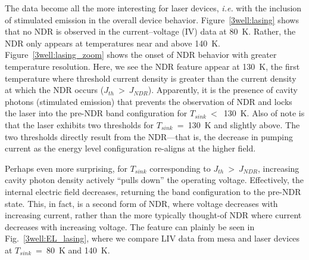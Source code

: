 \medskip

The data become all the more interesting for laser devices, \emph{i.e.} with the inclusion of stimulated emission in the overall device behavior. Figure~\ref{3well:lasing} shows that no NDR is observed in the current--voltage (IV) data at 80~K.  Rather, the NDR only appears at temperatures near and above 140~K.  Figure~\ref{3well:lasing_zoom} shows the onset of NDR behavior with greater temperature resolution.  Here, we see the NDR feature appear at 130~K, the first temperature where threshold current density is greater than the current density at which the NDR occurs ($J_{th}~>~J_{NDR}$).  Apparently, it is the presence of cavity photons (stimulated emission) that prevents the observation of NDR and locks the laser into the pre-NDR band configuration for $T_{sink}~<$~130~K.  Also of note is that the laser exhibits two thresholds for $T_{sink}$~=~130~K and slightly above.  The two thresholds directly result from the NDR---that is, the decrease in pumping current as the energy level configuration re-aligns at the higher field.

Perhaps even more surprising, for $T_{sink}$ corresponding to $J_{th}~>~J_{NDR}$, increasing cavity photon density actively ``pulls down'' the operating voltage.  Effectively, the internal electric field decreases, returning the band configuration to the pre-NDR state.  This, in fact, is a second form of NDR, where voltage decreases with increasing current, rather than the more typically thought-of NDR where current decreases with increasing voltage. The feature can plainly be seen in Fig.~\ref{3well:EL_lasing}, where we compare LIV data from mesa and laser devices at $T_{sink}$~=~80~K and 140~K.

